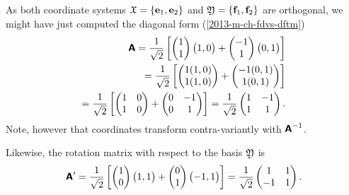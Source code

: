 {\begin{enumerate}
As both coordinate systems ${\frak X}
=
\{
{\bf e}_1,
{\bf e}_2
\}$
and
${\frak Y}
=  \{
{\bf f}_1,
{\bf f}_2
\}$ are orthogonal, we might have just computed
the diagonal form (\ref{2013-m-ch-fdvs-dftm})
\begin{equation}
\begin{split}
 \textsf{\textbf{A}}=
\frac{1}{\sqrt{2}}
\left[
\begin{pmatrix}
1\\
1
\end{pmatrix}
\begin{pmatrix}
1,0
\end{pmatrix}
+
\begin{pmatrix}
-1\\
1
\end{pmatrix}
\begin{pmatrix}
0,1
\end{pmatrix}
\right] \\
=
\frac{1}{\sqrt{2}}
\left[
\begin{pmatrix}
1(1,0)\\
1 (1,0)
\end{pmatrix}
+
\begin{pmatrix}
-1(0,1)\\
1(0,1)
\end{pmatrix}
\right] \\
=
\frac{1}{\sqrt{2}}
\left[
\begin{pmatrix}
1&0\\
1&0
\end{pmatrix}
+
\begin{pmatrix}
0&-1\\
0&1
\end{pmatrix}
\right]
=
\frac{1}{\sqrt{2}}
\begin{pmatrix}
1&-1\\
1&1
\end{pmatrix}
.
\end{split}
\end{equation}
Note, however that coordinates transform contra-variantly with
$\textsf{\textbf{A}}^{-1}$.

Likewise, the rotation matrix with respect to the basis ${\frak Y}$  is
\begin{equation}
\begin{split}
 \textsf{\textbf{A}}'=
\frac{1}{\sqrt{2}}
\left[
\begin{pmatrix}
1\\
0
\end{pmatrix}
\begin{pmatrix}
1,1
\end{pmatrix}
+
\begin{pmatrix}
0\\
1
\end{pmatrix}
\begin{pmatrix}
-1,1
\end{pmatrix}
\right]
=
\frac{1}{\sqrt{2}}
\begin{pmatrix}
1&1\\
-1&1
\end{pmatrix}
.
\end{split}
\end{equation}




\end{enumerate}}
